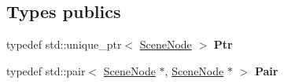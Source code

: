 \subsection*{Types publics}
\begin{DoxyCompactItemize}
\item 
\hypertarget{class_scene_node_aaf5c9ad8475874b51b70e400822f2e9a}{}\label{class_scene_node_aaf5c9ad8475874b51b70e400822f2e9a} 
typedef std\+::unique\+\_\+ptr$<$ \hyperlink{class_scene_node}{Scene\+Node} $>$ {\bfseries Ptr}
\item 
\hypertarget{class_scene_node_a366efca54698fa3f6eaf80b41e7ff4df}{}\label{class_scene_node_a366efca54698fa3f6eaf80b41e7ff4df} 
typedef std\+::pair$<$ \hyperlink{class_scene_node}{Scene\+Node} $\ast$, \hyperlink{class_scene_node}{Scene\+Node} $\ast$ $>$ {\bfseries Pair}
\end{DoxyCompactItemize}
